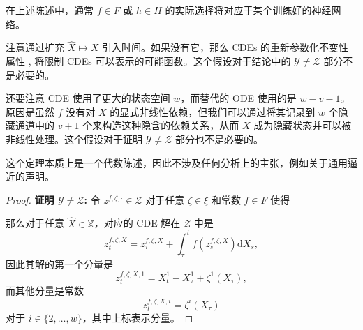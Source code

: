 \documentclass{ctexart}
\theoremstyle{plain}
\theoremstyle{definition}
\newcommand{\boldheading}[1]{

\textbf{#1}\quad}
\begin{document}
在上述陈述中，通常 $f \in F$ 或 $h \in H$ 的实际选择将对应于某个训练好的神经网络。
	
注意通过扩充 $\widehat{X} \mapsto X$ 引入时间。如果没有它，那么 CDEs 的重新参数化不变性属性 \cite{hambly2010uniqueness}, \cite[Proposition A.7]{kidger2019deep} 将限制 CDEs 可以表示的可能函数。这个假设对于结论中的 $\mathcal{Y} \neq \mathcal{Z}$ 部分不是必要的。
	
还要注意 CDE 使用了更大的状态空间 $w$，而替代的 ODE 使用的是 $w-v-1$。原因是虽然 $f$ 没有对 $X$ 的显式非线性依赖，但我们可以通过将其记录到 $w$ 个隐藏通道中的 $v + 1$ 个来构造这种隐含的依赖关系，从而 $X$ 成为隐藏状态并可以被非线性处理。这个假设对于证明 $\mathcal{Y} \neq \mathcal{Z}$ 部分也不是必要的。
	
这个定理本质上是一个代数陈述，因此不涉及任何分析上的主张，例如关于通用逼近的声明。
\begin{proof}\quad\newline
	
\boldheading{证明 $\mathcal{Y} \neq \mathcal{Z}$:}
令 $z^{f, \zeta, \cdot} \in \mathcal{Z}$ 对于任意 $\zeta \in \xi$ 和常数 $f \in F$ 使得
\begin{center}
\end{center}
	
那么对于任意 $\widehat{X} \in \mathbb{X}$，对应的 CDE 解在 $\mathcal{Z}$ 中是
\begin{equation*}
	z^{f, \zeta, X}_t = z^{f, \zeta, X}_{\tau} + \int_{\tau}^t f(z^{f, \zeta, X}_s) \mathrm{d}X_s,
\end{equation*}
因此其解的第一个分量是
\begin{equation*}
	z^{f, \zeta, X, 1}_t = X^1_t-X^1_\tau + \zeta^1(X_\tau),
\end{equation*}
而其他分量是常数
\begin{equation*}
	z^{f, \zeta, X, i}_t = \zeta^i(X_\tau)
\end{equation*}
对于 $i \in \{2, \ldots, w\}$，其中上标表示分量。
	

\end{proof}
\end{document}
